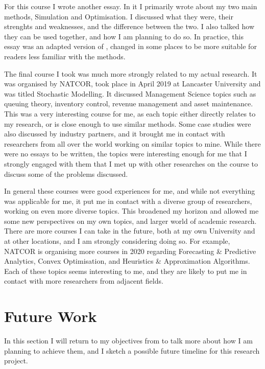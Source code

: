 \documentclass[a4paper,12pt]{article}
\begin{document}
For this course I wrote another essay. In it I primarily wrote about my two main methods, Simulation and Optimisation. I discussed what they were, their strenghts and weaknesses, and the difference between the two. I also talked how they can be used together, and how I am planning to do so. In practice, this essay was an adapted version of , changed in some places to be more suitable for readers less familiar with the methods. 

\bigskip

The final course I took was much more strongly related to my actual research. It was organised by NATCOR, took place in April 2019 at Lancaster University and was titled Stochastic Modelling. It discussed Management Science topics such as queuing theory, inventory control, revenue management and asset maintenance. This was a very interesting course for me, as each topic either directly relates to my research, or is close enough to use similar methods. Some case studies were also discussed by industry partners, and it brought me in contact with researchers from all over the world working on similar topics to mine. While there were no essays to be written, the topics were interesting enough for me that I strongly engaged with them that I met up with other researches on the course to discuss some of the problems discussed. 

\bigskip

In general these courses were good experiences for me, and while not everything was applicable for me, it put me in contact with a diverse group of researchers, working on even more diverse topics. This broadened my horizon and allowed me some new perspectives on my own topics, and larger world of academic research. There are more courses I can take in the future, both at my own University and at other locations, and I am strongly considering doing so. For example, NATCOR is organising more courses in 2020 regarding Forecasting \& Predictive Analytics, Convex Optimisation, and Heuristics \& Approximation Algorithms. Each of these topics seems interesting to me, and they are likely to put me in contact with more researchers from adjacent fields. 

\pagebreak

\section{Future Work} \label{s:concl}
In this section I will return to my objectives from  to talk more about how I am planning to achieve them, and I sketch a possible future timeline for this research project. 
\end{document}
